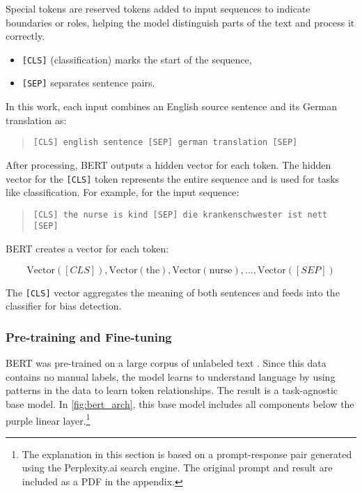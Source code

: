 \noindent Special tokens are reserved tokens added to input sequences to indicate boundaries or roles, helping the model distinguish parts of the text and process it correctly.

\begin{itemize}
	\item \texttt{[CLS]} (classification) marks the start of the sequence,
	\item \texttt{[SEP]} separates sentence pairs.
\end{itemize}

\noindent In this work, each input combines an English source sentence and its German translation as:

\begin{quote}
    \texttt{[CLS] english sentence [SEP] german translation [SEP]}
\end{quote}

\noindent After processing, BERT outputs a hidden vector for each token. The hidden vector for the \texttt{[CLS]} token represents the entire sequence and is used for tasks like classification. For example, for the input sequence:

\begin{quote}
\texttt{[CLS] the nurse is kind [SEP] die krankenschwester ist nett [SEP]}
\end{quote}

\noindent BERT creates a vector for each token:

\[
\text{Vector}([CLS]), \text{Vector}(\text{the}), \text{Vector}(\text{nurse}), \ldots, \text{Vector}([SEP])
\]

\noindent The \texttt{[CLS]} vector aggregates the meaning of both sentences and feeds into the classifier for bias detection.


\subsubsection{Pre-training and Fine-tuning}
BERT was pre-trained on a large corpus of unlabeled text \citep{devlinBERTPretrainingDeep2019}. Since this data contains no manual labels, the model learns to understand language by using patterns in the data to learn token relationships. The result is a task-agnostic base model. In \autoref{fig:bert_arch}, this base model includes all components below the purple linear layer.\footnote{The explanation in this section is based on a prompt-response pair generated using the Perplexity.ai search engine. The original prompt and result are included as a PDF in the appendix.}


